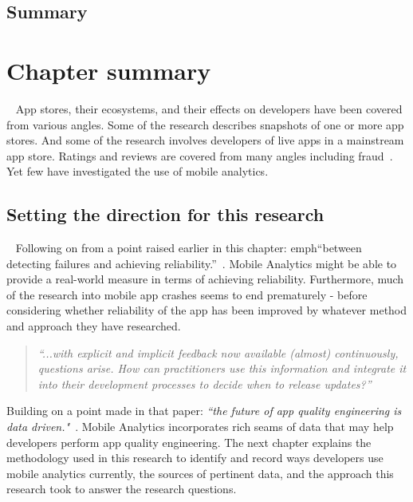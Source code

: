 \subsection{Summary} %

\section{Chapter summary}~\label{rw-summary-so-far-section}
App stores, their ecosystems, and their effects on developers have been covered from various angles. Some of the research describes snapshots of one or more app stores. And some of the research involves developers of live apps in a mainstream app store. Ratings and reviews are covered from many angles including fraud~. Yet few have investigated the use of mobile analytics.


\subsection{Setting the direction for this research}~\label{rw-setting-the-direction-for-this-research-topic}
Following on from a point raised earlier in this chapter: emph{``between detecting failures and achieving reliability.''}~. Mobile Analytics might be able to provide a real-world measure in terms of achieving reliability. Furthermore, much of the research into mobile app crashes seems to end prematurely - before considering whether reliability of the app has been improved by whatever method and approach they have researched.

\begin{quote}
    \emph{``...with explicit and implicit feedback now available (almost) continuously, questions arise. How can practitioners use this information and integrate it into their development processes to decide when to release updates?''}    
\end{quote}

Building on a point made in that paper: \emph{``the future of app quality engineering is data driven."}~. Mobile Analytics incorporates rich seams of data that may help developers perform app quality engineering. The next chapter explains the methodology used in this research to identify and record ways developers use mobile analytics currently, the sources of pertinent data, and the approach this research took to answer the research questions.


